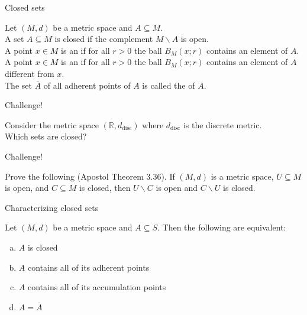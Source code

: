 \documentclass{beamer}
\begin{document}
\begin{frame}{Closed sets}
\begin{defn}
\pause
Let $(M,d)$ be a metric space and $A\subseteq M$.\\
\pause
A set $A\subseteq M$ is closed if the complement $M\backslash A$ is open.\\
\pause
A point $ x\in M$ is an  if for all $r>0$ the ball $B_M( x; r)$ contains an element of $A$.\\
\pause
A point $ x\in M$ is an  if for all $r>0$ the ball $B_M( x; r)$ contains an element of $A$ different from $x$.\\
\pause
The set $\overline A$ of all adherent points of $A$ is called the  of $A$.
\end{defn}
\end{frame}


\begin{frame}{Challenge!}
\begin{prob}
Consider the metric space $(\mathbb{R},d_{\text{disc}})$ where $d_{\text{disc}}$ is the discrete metric.\\
Which sets are closed?
\end{prob}
\end{frame}

\begin{frame}{Challenge!}
\begin{prob}
Prove the following (Apostol Theorem 3.36).
If $(M,d)$ is a metric space, $U\subseteq M$ is open, and $C\subseteq M$ is closed, then $U\backslash C$ is open and $C\backslash U$ is closed.
\end{prob}
\end{frame}

\begin{frame}{Characterizing closed sets}
\begin{thm}
Let $(M,d)$ be a metric space and $A\subseteq S$.  Then the following are equivalent:
\begin{enumerate}[(a)]
\pause
\item $A$ is closed
\pause
\item $A$ contains all of its adherent points
\pause
\item $A$ contains all of its accumulation points
\pause
\item $A=\overline{A}$
\end{enumerate}
\end{thm}
\end{frame}
\end{document}

